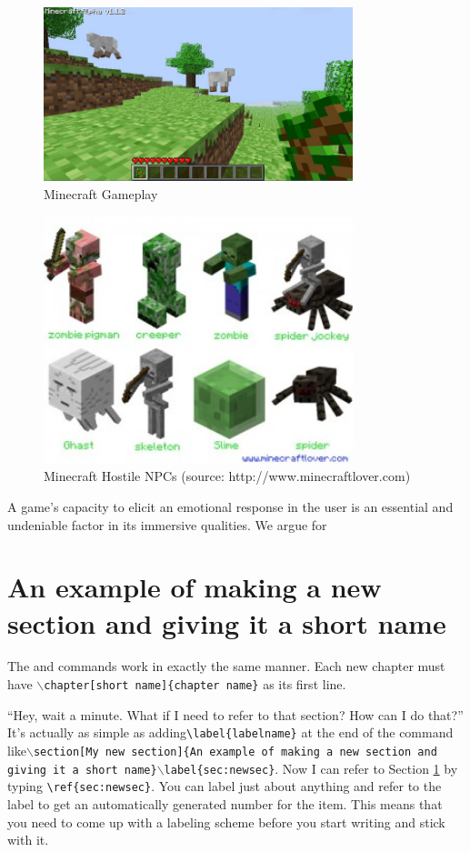 \begin{figure}[ht!]
\centering
\includegraphics[width=90mm]{minecraft-32.jpg}
\caption{Minecraft Gameplay \label{overflow}}
\label{fig:Minecraft}
\end{figure}
\cite{fig:MCmonster} 
\begin{figure}[ht!]
\centering
\includegraphics[width=90mm]{minecraft-spider-300x240.jpg}
\caption{Minecraft Hostile NPCs (source: http://www.minecraftlover.com) \label{overflow}}
\label{fig:MCmonster}
\end{figure}
A game's capacity to elicit an emotional response in the user is an essential and undeniable factor in its immersive qualities. We argue for  
\section[My new section]{An example of making a new section and giving it a short name}\label{sec:newsec}

The  and  commands work in exactly the same manner. Each new chapter must have \texttt{$\backslash$chapter[short name]\{chapter name\}} as its first line.

``Hey, wait a minute. What if I need to refer to that section? How can I do that?'' It's actually as simple as adding\verb+\label{labelname}+ at the end of the  command like\texttt{$\backslash$section[My new section]\{An example of making a new section and giving it a short name\}$\backslash$label\{sec:newsec\}}. Now I can refer to Section \ref{sec:newsec} by typing \verb+\ref{sec:newsec}+. You can label just about anything and refer to the label to get an automatically generated number for the item. This means that you need to come up with a labeling scheme before you start writing and stick with it.

